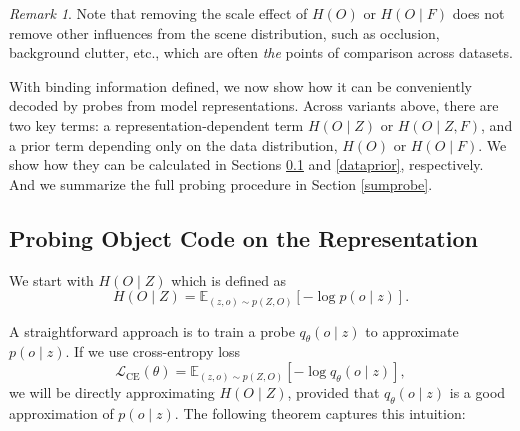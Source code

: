 \documentclass{article}
\theoremstyle{plain}
\theoremstyle{definition}
\theoremstyle{remark}
\newtheorem{remark}[theorem]{Remark}
\begin{document}
\begin{remark}
    Note that removing the scale effect of $H(O)$ or $H(O\mid F)$ does not remove other influences from the scene distribution, such as occlusion, background clutter, etc., which are often \textit{the} points of comparison across datasets.
\end{remark}


With binding information defined, we now show how it can be conveniently decoded by probes from model representations. Across variants above, there are two key terms: a representation-dependent term $H(O\mid Z)$ or $H(O\mid Z, F)$, and a prior term depending only on the data distribution, $H(O)$ or $H(O\mid F)$. We show how they can be calculated in Sections \ref{bindingprobe} and \ref{dataprior}, respectively. And we summarize the full probing procedure in Section \ref{sumprobe}.

\subsection{Probing Object Code on the Representation} 
\label{bindingprobe}
We start with $H(O\mid Z)$ which is defined as
\[H(O\mid Z)
=
\mathbb E_{(z,o)\sim p(Z,O)}
\left[-\log p(o\mid z)\right].\]

A straightforward approach is to train a probe $q_{\theta}(o\mid z)$ to approximate $p(o\mid z)$. If we use cross-entropy loss 
\begin{equation}
    \mathcal L_{\mathrm{CE}}(\theta)
=
\mathbb E_{(z,o)\sim p(Z,O)}
\left[-\log q_\theta(o\mid z)\right], \label{celoss}  
\end{equation}
we will be directly approximating $H(O\mid Z)$, provided that $q_{\theta}(o\mid z)$ is a good approximation of $p(o\mid z)$. The following theorem captures this intuition:
\end{document}
